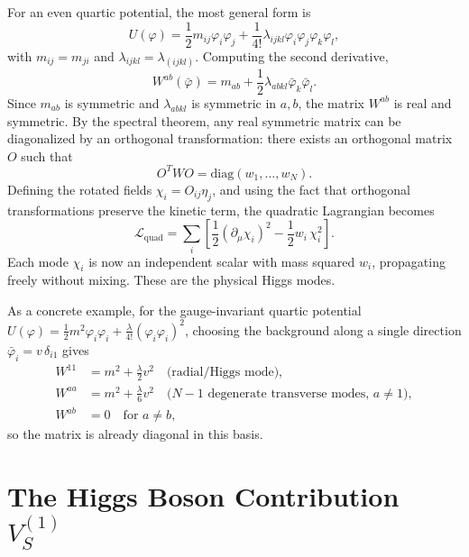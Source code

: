 For an even quartic potential, the most general form is
\begin{equation}
    U(\varphi) = \frac{1}{2}m_{ij}\varphi_i\varphi_j
    + \frac{1}{4!}\lambda_{ijkl}\varphi_i\varphi_j\varphi_k\varphi_l,
\end{equation}
with $m_{ij} = m_{ji}$ and $\lambda_{ijkl} = \lambda_{(ijkl)}$.
Computing the second derivative,
\begin{equation}
    W^{ab}(\bar\varphi) = m_{ab}
    + \frac{1}{2}\lambda_{abkl}\bar\varphi_k\bar\varphi_l.
\end{equation}
Since $m_{ab}$ is symmetric and $\lambda_{abkl}$ is symmetric in $a,b$,
the matrix $W^{ab}$ is real and symmetric. By the spectral theorem, any
real symmetric matrix can be diagonalized by an orthogonal transformation:
there exists an orthogonal matrix $O$ such that
\begin{equation}
    O^T W O = \mathrm{diag}(w_1,\ldots,w_N).
\end{equation}
Defining the rotated fields $\chi_i = O_{ij}\eta_j$, and using the fact
that orthogonal transformations preserve the kinetic term, the quadratic
Lagrangian becomes
\begin{equation}
    \boxed{\mathcal{L}_{\text{quad}} = \sum_i\left[
    \frac{1}{2}(\partial_\mu\chi_i)^2
    - \frac{1}{2}w_i\,\chi_i^2\right].}
\end{equation}
Each mode $\chi_i$ is now an independent scalar with mass squared $w_i$,
propagating freely without mixing. These are the physical Higgs modes.

As a concrete example, for the gauge-invariant quartic potential
$U(\varphi) = \frac{1}{2}m^2\varphi_i\varphi_i
+ \frac{\lambda}{4!}(\varphi_i\varphi_i)^2$,
choosing the background along a single direction
$\bar\varphi_i = v\,\delta_{i1}$ gives
\begin{align}
    W^{11} &= m^2 + \frac{\lambda}{2}v^2
    \quad\text{(radial/Higgs mode)}, \\
    W^{aa} &= m^2 + \frac{\lambda}{6}v^2
    \quad\text{($N-1$ degenerate transverse modes, $a\neq 1$)}, \\
    W^{ab} &= 0 \quad\text{for $a\neq b$},
\end{align}
so the matrix is already diagonal in this basis.

\section{The Higgs Boson Contribution \texorpdfstring{$V_S^{(1)}$}{VS}}

